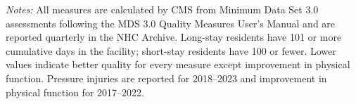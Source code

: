 \documentclass[12pt]{article}
\begin{document}
\begin{table}[!ht]
\begin{threeparttable}
\begin{tabularx}{\textwidth}{>{\raggedright\arraybackslash}p{} >{\raggedright\arraybackslash}X}
\bottomrule
\end{tabularx}
\begin{tablenotes}
\footnotesize
\item \textit{Notes:} All measures are calculated by CMS from Minimum Data Set 3.0 assessments following the MDS 3.0 Quality Measures User's Manual and are reported quarterly in the NHC Archive. Long-stay residents have 101 or more cumulative days in the facility; short-stay residents have 100 or fewer. Lower values indicate better quality for every measure except improvement in physical function. Pressure injuries are reported for 2018--2023 and improvement in physical function for 2017--2022.
\end{tablenotes}
\end{threeparttable}
\end{table}
\end{document}
